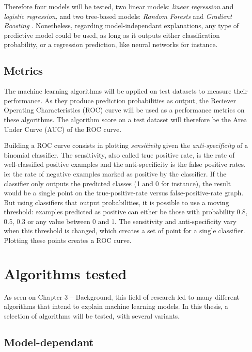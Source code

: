 \documentclass[a4paper,11pt]{kth-mag}
\begin{document}
Therefore four models will be tested, two linear models: \textit{linear regression} and \textit{logistic regression}, and two tree-based models: \textit{Random Forests} \cite{Breiman2001} and \textit{Gradient Boosting} \cite{Friedman2001}. Nonetheless, regarding model-independant explanations, any type of predictive model could be used, as long as it outputs either classification probability, or a regression prediction, like neural networks for instance.

\subsection{Metrics}

The machine learning algorithms will be applied on test datasets to measure their performance. As they produce prediction probabilities as output, the Reciever Operating Characteristics (ROC) curve will be used as a performance metrics on these algorithms. The algorithm score on a test dataset will therefore be the Area Under Curve (AUC) of the ROC curve.

Building a ROC curve consists in plotting \textit{sensitivity} given the \textit{anti-specificity} of a binomial classifier. The sensitivity, also called true positive rate, is the rate of well-classified positive examples and the anti-specificity is the false positive rates, ie: the rate of negative examples marked as positive by the classifier. If the classifier only outputs the predicted classes (1 and 0 for instance), the result would be a single point on the true-positive-rate versus false-positive-rate graph. But using classifiers that output probabilities, it is possible to use a moving threshold: examples predicted as positive can either be those with probability 0.8, 0.5, 0.3 or any value between 0 and 1. The sensitivity and anti-specificity vary when this threshold is changed, which creates a set of point for a single classifier. Plotting these points creates a ROC curve.

\section{Algorithms tested}

As seen on Chapter 3 -- Background, this field of research led to many different algorithms that intend to explain machine learning models. In this thesis, a selection of algorithms will be tested, with several variants.

\subsection{Model-dependant}
\end{document}
